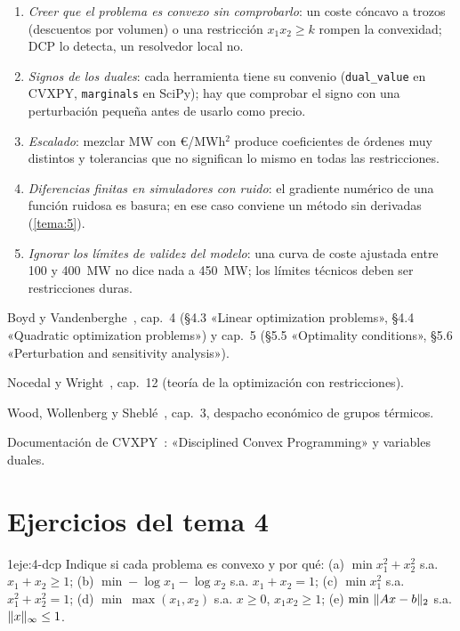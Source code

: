 \begin{observacion}\label{obs:errores4}
\begin{enumerate}[label=(\alph*)]
  \item \emph{Creer que el problema es convexo sin comprobarlo}: un coste cóncavo a trozos (descuentos por volumen) o una restricción $x_1x_2\ge k$ rompen la convexidad; DCP lo detecta, un resolvedor local no.
  \item \emph{Signos de los duales}: cada herramienta tiene su convenio (\texttt{dual\_value} en CVXPY, \texttt{marginals} en SciPy); hay que comprobar el signo con una perturbación pequeña antes de usarlo como precio.
  \item \emph{Escalado}: mezclar MW con €/MWh$^2$ produce coeficientes de órdenes muy distintos y tolerancias que no significan lo mismo en todas las restricciones.
  \item \emph{Diferencias finitas en simuladores con ruido}: el gradiente numérico de una función ruidosa es basura; en ese caso conviene un método sin derivadas (\cref{tema:5}).
  \item \emph{Ignorar los límites de validez del modelo}: una curva de coste ajustada entre 100 y 400~MW no dice nada a 450~MW; los límites técnicos deben ser restricciones duras.
\end{enumerate}
\end{observacion}

\begin{lecturas}
\item Boyd y Vandenberghe~\cite{bv}, cap.~4 (§4.3 «Linear optimization problems», §4.4 «Quadratic optimization problems») y cap.~5 (§5.5 «Optimality conditions», §5.6 «Perturbation and sensitivity analysis»).
\item Nocedal y Wright~\cite{nw}, cap.~12 (teoría de la optimización con restricciones).
\item Wood, Wollenberg y Sheblé~\cite{wood}, cap.~3, despacho económico de grupos térmicos.
\item Documentación de CVXPY~\cite{cvxpydoc}: «Disciplined Convex Programming» y variables duales.
\end{lecturas}

\section*{Ejercicios del tema 4}

\begin{ejercicio}{1}{eje:4-dcp}
Indique si cada problema es convexo y por qué: (a) $\min x_1^{2}+x_2^{2}$ s.a. $x_1+x_2\ge 1$; (b) $\min -\log x_1-\log x_2$ s.a. $x_1+x_2=1$; (c) $\min x_1^{2}$ s.a. $x_1^{2}+x_2^{2}=1$; (d) $\min\ \max(x_1,x_2)$ s.a. $x\ge 0$, $x_1x_2\ge 1$; (e) $\min\ \lVert Ax-b\rVert_2$ s.a. $\lVert x\rVert_\infty\le 1$.
\end{ejercicio}


